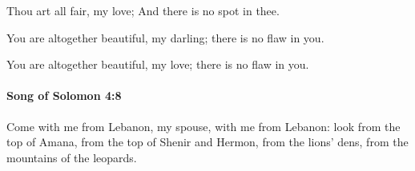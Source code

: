 			\begin{versebox}
					\item[BHS] 
					\item[LXX] 
					\item[ASV] Thou art all fair, my love; And there is no spot in thee.
					\item[NIV] You are altogether beautiful, my darling; there is no flaw in you.
					\item[NRSV] You are altogether beautiful, my love; there is no flaw in you.
			\end{versebox}

		\paragraph{Song of Solomon 4:8} %
			\label{SONGOFSOLOMON-4-8}

			Come with me from Lebanon, my spouse, with me from Lebanon: look from the top of Amana, from the top of Shenir and Hermon, from the lions’ dens, from the mountains of the leopards.

